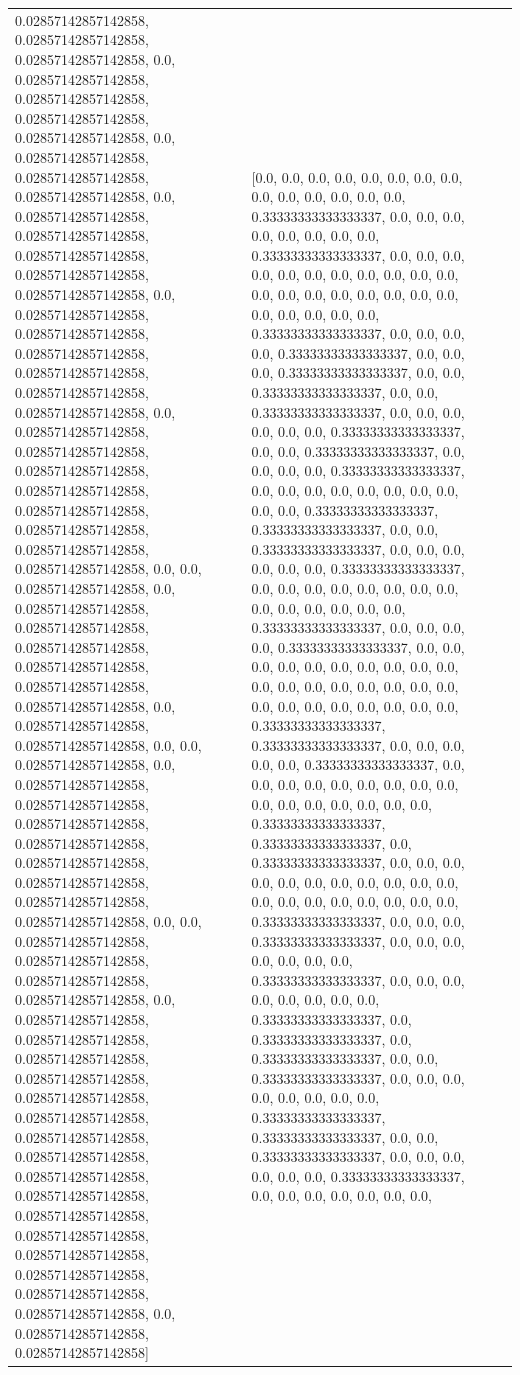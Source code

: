 \begin{tabular}{llll}
0.02857142857142858, 0.02857142857142858, 0.02857142857142858, 0.0, 0.02857142857142858, 0.02857142857142858, 0.02857142857142858, 0.02857142857142858, 0.0, 0.02857142857142858, 0.02857142857142858, 0.02857142857142858, 0.0, 0.02857142857142858, 0.02857142857142858, 0.02857142857142858, 0.02857142857142858, 0.02857142857142858, 0.0, 0.02857142857142858, 0.02857142857142858, 0.02857142857142858, 0.02857142857142858, 0.02857142857142858, 0.02857142857142858, 0.0, 0.02857142857142858, 0.02857142857142858, 0.02857142857142858, 0.02857142857142858, 0.02857142857142858, 0.02857142857142858, 0.02857142857142858, 0.02857142857142858, 0.0, 0.0, 0.02857142857142858, 0.0, 0.02857142857142858, 0.02857142857142858, 0.02857142857142858, 0.02857142857142858, 0.02857142857142858, 0.02857142857142858, 0.0, 0.02857142857142858, 0.02857142857142858, 0.0, 0.0, 0.02857142857142858, 0.0, 0.02857142857142858, 0.02857142857142858, 0.02857142857142858, 0.02857142857142858, 0.02857142857142858, 0.02857142857142858, 0.02857142857142858, 0.02857142857142858, 0.0, 0.0, 0.02857142857142858, 0.02857142857142858, 0.02857142857142858, 0.02857142857142858, 0.0, 0.02857142857142858, 0.02857142857142858, 0.02857142857142858, 0.02857142857142858, 0.02857142857142858, 0.02857142857142858, 0.02857142857142858, 0.02857142857142858, 0.02857142857142858, 0.02857142857142858, 0.02857142857142858, 0.02857142857142858, 0.02857142857142858, 0.02857142857142858, 0.02857142857142858, 0.02857142857142858, 0.0, 0.02857142857142858, 0.02857142857142858] & [0.0, 0.0, 0.0, 0.0, 0.0, 0.0, 0.0, 0.0, 0.0, 0.0, 0.0, 0.0, 0.0, 0.0, 0.33333333333333337, 0.0, 0.0, 0.0, 0.0, 0.0, 0.0, 0.0, 0.0, 0.33333333333333337, 0.0, 0.0, 0.0, 0.0, 0.0, 0.0, 0.0, 0.0, 0.0, 0.0, 0.0, 0.0, 0.0, 0.0, 0.0, 0.0, 0.0, 0.0, 0.0, 0.0, 0.0, 0.0, 0.0, 0.0, 0.33333333333333337, 0.0, 0.0, 0.0, 0.0, 0.33333333333333337, 0.0, 0.0, 0.0, 0.33333333333333337, 0.0, 0.0, 0.33333333333333337, 0.0, 0.0, 0.33333333333333337, 0.0, 0.0, 0.0, 0.0, 0.0, 0.0, 0.33333333333333337, 0.0, 0.0, 0.33333333333333337, 0.0, 0.0, 0.0, 0.0, 0.33333333333333337, 0.0, 0.0, 0.0, 0.0, 0.0, 0.0, 0.0, 0.0, 0.0, 0.0, 0.33333333333333337, 0.33333333333333337, 0.0, 0.0, 0.33333333333333337, 0.0, 0.0, 0.0, 0.0, 0.0, 0.0, 0.33333333333333337, 0.0, 0.0, 0.0, 0.0, 0.0, 0.0, 0.0, 0.0, 0.0, 0.0, 0.0, 0.0, 0.0, 0.0, 0.33333333333333337, 0.0, 0.0, 0.0, 0.0, 0.33333333333333337, 0.0, 0.0, 0.0, 0.0, 0.0, 0.0, 0.0, 0.0, 0.0, 0.0, 0.0, 0.0, 0.0, 0.0, 0.0, 0.0, 0.0, 0.0, 0.0, 0.0, 0.0, 0.0, 0.0, 0.0, 0.0, 0.0, 0.33333333333333337, 0.33333333333333337, 0.0, 0.0, 0.0, 0.0, 0.0, 0.33333333333333337, 0.0, 0.0, 0.0, 0.0, 0.0, 0.0, 0.0, 0.0, 0.0, 0.0, 0.0, 0.0, 0.0, 0.0, 0.0, 0.0, 0.33333333333333337, 0.33333333333333337, 0.0, 0.33333333333333337, 0.0, 0.0, 0.0, 0.0, 0.0, 0.0, 0.0, 0.0, 0.0, 0.0, 0.0, 0.0, 0.0, 0.0, 0.0, 0.0, 0.0, 0.0, 0.0, 0.33333333333333337, 0.0, 0.0, 0.0, 0.33333333333333337, 0.0, 0.0, 0.0, 0.0, 0.0, 0.0, 0.0, 0.33333333333333337, 0.0, 0.0, 0.0, 0.0, 0.0, 0.0, 0.0, 0.0, 0.33333333333333337, 0.0, 0.33333333333333337, 0.0, 0.33333333333333337, 0.0, 0.0, 0.33333333333333337, 0.0, 0.0, 0.0, 0.0, 0.0, 0.0, 0.0, 0.0, 0.33333333333333337, 0.33333333333333337, 0.0, 0.0, 0.33333333333333337, 0.0, 0.0, 0.0, 0.0, 0.0, 0.0, 0.33333333333333337, 0.0, 0.0, 0.0, 0.0, 0.0, 0.0, 0.0, 
\end{tabular}
